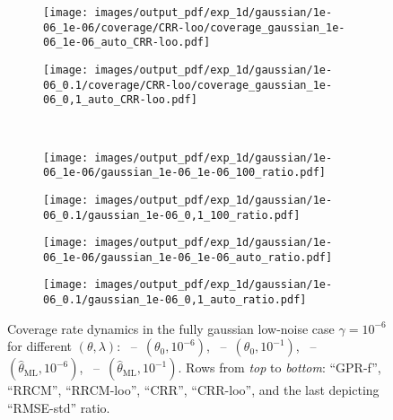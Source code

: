 \documentclass[a4paper,14pt]{extarticle}
\begin{document}
\begin{figure}
\begin{subfigure}[b]{0.25\linewidth}
  \end{subfigure}%
  \begin{subfigure}[b]{0.25\linewidth}
    \texttt{[image: images/output\_pdf/exp\_1d/gaussian/1e-06\_1e-06/coverage/CRR-loo/coverage\_gaussian\_1e-06\_1e-06\_auto\_CRR-loo.pdf]}
  \end{subfigure}%
  \begin{subfigure}[b]{0.25\linewidth}
    \texttt{[image: images/output\_pdf/exp\_1d/gaussian/1e-06\_0.1/coverage/CRR-loo/coverage\_gaussian\_1e-06\_0,1\_auto\_CRR-loo.pdf]}
  \end{subfigure}\\
  \begin{subfigure}[b]{0.25\linewidth}
    \texttt{[image: images/output\_pdf/exp\_1d/gaussian/1e-06\_1e-06/gaussian\_1e-06\_1e-06\_100\_ratio.pdf]}
    \caption{} \label{fig:gaussian_1d_low_noise_c1}
  \end{subfigure}%
  \begin{subfigure}[b]{0.25\linewidth}
    \texttt{[image: images/output\_pdf/exp\_1d/gaussian/1e-06\_0.1/gaussian\_1e-06\_0,1\_100\_ratio.pdf]}
    \caption{} \label{fig:gaussian_1d_low_noise_c2}
  \end{subfigure}%
  \begin{subfigure}[b]{0.25\linewidth}
    \texttt{[image: images/output\_pdf/exp\_1d/gaussian/1e-06\_1e-06/gaussian\_1e-06\_1e-06\_auto\_ratio.pdf]}
    \caption{} \label{fig:gaussian_1d_low_noise_c3}
  \end{subfigure}%
  \begin{subfigure}[b]{0.25\linewidth}
    \texttt{[image: images/output\_pdf/exp\_1d/gaussian/1e-06\_0.1/gaussian\_1e-06\_0,1\_auto\_ratio.pdf]}
    \caption{} \label{fig:gaussian_1d_low_noise_c4}
  \end{subfigure}%
  \caption{Coverage rate dynamics in the fully gaussian low-noise case $\gamma=10^{-6}$
  for different $(\theta, \lambda)$:
  ~--~$(\theta_0, 10^{-6})$,
  ~--~$(\theta_0, 10^{-1})$,
  ~--~$(\hat{\theta}_\text{ML}, 10^{-6})$,
  ~--~$(\hat{\theta}_\text{ML}, 10^{-1})$.
  Rows from \textit{top} to \textit{bottom}: ``GPR-f'', ``RRCM'', ``RRCM-loo'',
  ``CRR'', ``CRR-loo'', and the last depicting ``RMSE-std'' ratio.}
  \label{fig:gaussian_1d_low_noise}
\end{figure}
\end{document}
